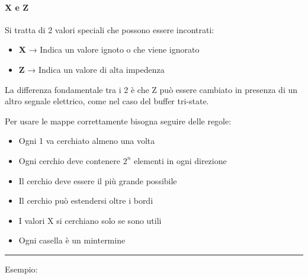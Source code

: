 \documentclass{article}
\begin{document}
\paragraph{X e Z}

Si tratta di 2 valori speciali che possono essere incontrati:
\begin{itemize}
    \item \textbf{X} → Indica un valore ignoto o che viene ignorato
    \item \textbf{Z} → Indica un valore di alta impedenza
\end{itemize}

\vspace{2pt}

La differenza fondamentale tra i 2 è che Z può essere cambiato in presenza di un altro segnale elettrico, come nel caso del buffer tri-state.\newline

\vspace{5pt}

Per usare le mappe correttamente bisogna seguire delle regole:
\begin{itemize}
    \item Ogni 1 va cerchiato almeno una volta
    \item Ogni cerchio deve contenere $2^n$ elementi in ogni direzione
    \item Il cerchio deve essere il più grande possibile
    \item Il cerchio può estendersi oltre i bordi
    \item I valori X si cerchiano solo se sono utili
    \item Ogni casella è un mintermine
\end{itemize}

\newpage

\noindent\rule{\textwidth}{0.5pt}

Esempio:
\end{document}
